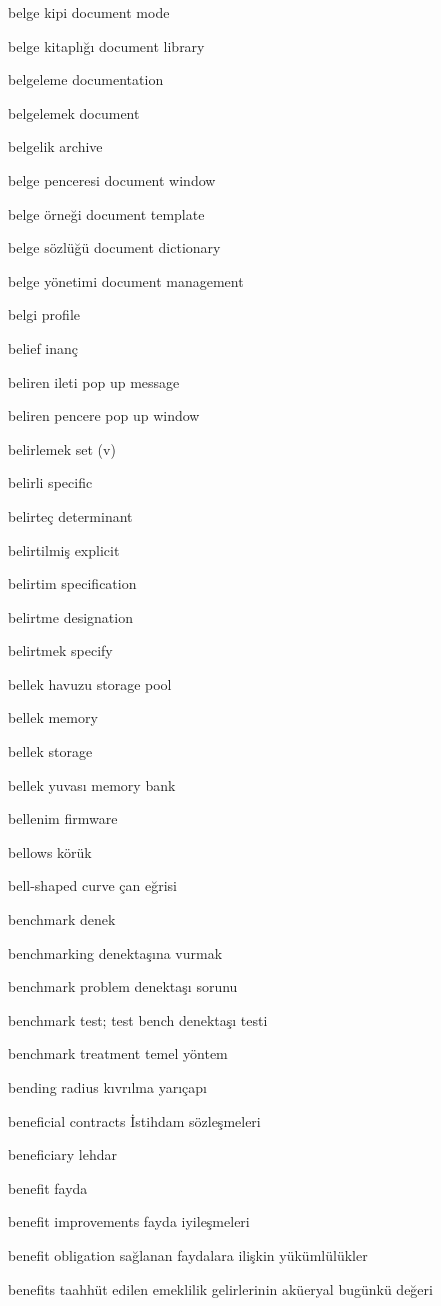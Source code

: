 \documentclass[12pt,fleqn]{article}\usepackage{../../common}
\begin{document}
belge kipi document mode

belge kitaplığı document library

belgeleme documentation

belgelemek document

belgelik archive

belge penceresi document window

belge örneği document template

belge sözlüğü document dictionary

belge yönetimi document management

belgi profile

belief inanç

beliren ileti pop up message

beliren pencere pop up window

belirlemek set (v)

belirli specific

belirteç determinant

belirtilmiş explicit

belirtim specification

belirtme designation

belirtmek specify

bellek havuzu storage pool

bellek memory

bellek storage

bellek yuvası memory bank

bellenim firmware

bellows körük

bell-shaped curve çan eğrisi

benchmark denek

benchmarking denektaşına vurmak

benchmark problem denektaşı sorunu

benchmark test; test bench denektaşı testi

benchmark treatment temel yöntem

bending radius kıvrılma yarıçapı

beneficial contracts İstihdam sözleşmeleri

beneficiary lehdar

benefit fayda

benefit improvements fayda iyileşmeleri

benefit obligation sağlanan faydalara ilişkin yükümlülükler

benefits taahhüt edilen emeklilik gelirlerinin aküeryal bugünkü değeri
\end{document}
